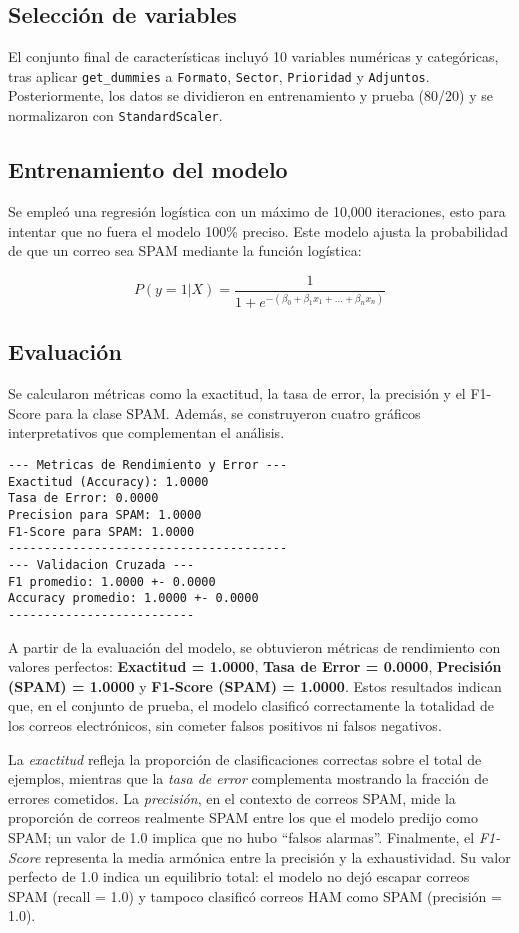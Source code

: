 \documentclass[12pt,a4paper]{article}
\begin{document}
\subsection{Selección de variables}
El conjunto final de características incluyó 10 variables numéricas y categóricas, tras aplicar \texttt{get\_dummies} a \texttt{Formato}, \texttt{Sector}, \texttt{Prioridad} y \texttt{Adjuntos}. Posteriormente, los datos se dividieron en entrenamiento y prueba (80/20) y se normalizaron con \texttt{StandardScaler}.

\subsection{Entrenamiento del modelo}
Se empleó una regresión logística con un máximo de 10,000 iteraciones, esto para intentar que no fuera el modelo 100\% preciso. Este modelo ajusta la probabilidad de que un correo sea SPAM mediante la función logística:

\begin{equation}
P(y=1|X) = \frac{1}{1 + e^{-(\beta_0 + \beta_1x_1 + ... + \beta_nx_n)}}
\end{equation}

\subsection{Evaluación}
Se calcularon métricas como la exactitud, la tasa de error, la precisión y el F1-Score para la clase SPAM. Además, se construyeron cuatro gráficos interpretativos que complementan el análisis.
\begin{lstlisting}
--- Metricas de Rendimiento y Error ---
Exactitud (Accuracy): 1.0000
Tasa de Error: 0.0000
Precision para SPAM: 1.0000
F1-Score para SPAM: 1.0000
---------------------------------------
--- Validacion Cruzada ---
F1 promedio: 1.0000 +- 0.0000
Accuracy promedio: 1.0000 +- 0.0000
--------------------------
\end{lstlisting}
A partir de la evaluación del modelo, se obtuvieron métricas de rendimiento con valores perfectos: \textbf{Exactitud = 1.0000}, \textbf{Tasa de Error = 0.0000}, \textbf{Precisión (SPAM) = 1.0000} y \textbf{F1-Score (SPAM) = 1.0000}. Estos resultados indican que, en el conjunto de prueba, el modelo clasificó correctamente la totalidad de los correos electrónicos, sin cometer falsos positivos ni falsos negativos.  

La \textit{exactitud} refleja la proporción de clasificaciones correctas sobre el total de ejemplos, mientras que la \textit{tasa de error} complementa mostrando la fracción de errores cometidos. La \textit{precisión}, en el contexto de correos SPAM, mide la proporción de correos realmente SPAM entre los que el modelo predijo como SPAM; un valor de 1.0 implica que no hubo ``falsos alarmas''. Finalmente, el \textit{F1-Score} representa la media armónica entre la precisión y la exhaustividad. Su valor perfecto de 1.0 indica un equilibrio total: el modelo no dejó escapar correos SPAM (recall = 1.0) y tampoco clasificó correos HAM como SPAM (precisión = 1.0).  
\end{document}
